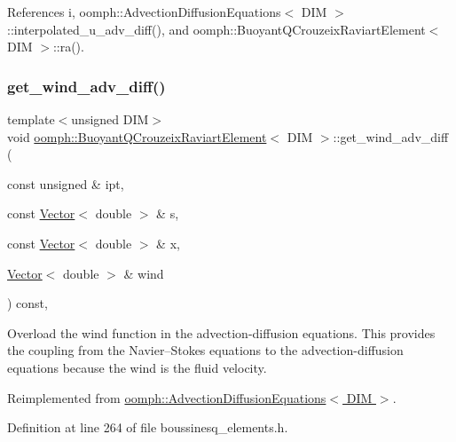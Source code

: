 References i, oomph\+::\+Advection\+Diffusion\+Equations$<$ D\+I\+M $>$\+::interpolated\+\_\+u\+\_\+adv\+\_\+diff(), and oomph\+::\+Buoyant\+Q\+Crouzeix\+Raviart\+Element$<$ D\+I\+M $>$\+::ra().

\mbox{\label{classoomph_1_1BuoyantQCrouzeixRaviartElement_ade5820ae7c44a9371dcc348ca5a3ab1c}} 
\subsubsection{\texorpdfstring{get\+\_\+wind\+\_\+adv\+\_\+diff()}{get\_wind\_adv\_diff()}}
{\footnotesize\ttfamily template$<$unsigned D\+IM$>$ \\
void \hyperlink{classoomph_1_1BuoyantQCrouzeixRaviartElement}{oomph\+::\+Buoyant\+Q\+Crouzeix\+Raviart\+Element}$<$ D\+IM $>$\+::get\+\_\+wind\+\_\+adv\+\_\+diff (\begin{DoxyParamCaption}\item[{const unsigned \&}]{ipt,  }\item[{const \hyperlink{classoomph_1_1Vector}{Vector}$<$ double $>$ \&}]{s,  }\item[{const \hyperlink{classoomph_1_1Vector}{Vector}$<$ double $>$ \&}]{x,  }\item[{\hyperlink{classoomph_1_1Vector}{Vector}$<$ double $>$ \&}]{wind }\end{DoxyParamCaption}) const\hspace{0.3cm}{\ttfamily [inline]}, {\ttfamily [virtual]}}



Overload the wind function in the advection-\/diffusion equations. This provides the coupling from the Navier--Stokes equations to the advection-\/diffusion equations because the wind is the fluid velocity. 



Reimplemented from \hyperlink{classoomph_1_1AdvectionDiffusionEquations_a32cb2f977b32fabfc23d1134749371ed}{oomph\+::\+Advection\+Diffusion\+Equations$<$ D\+I\+M $>$}.



Definition at line 264 of file boussinesq\+\_\+elements.\+h.




